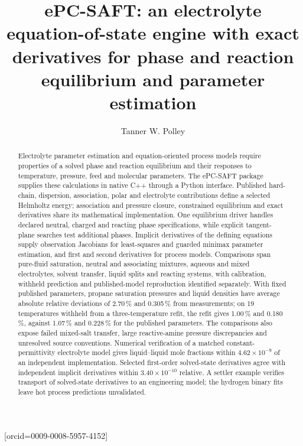 \documentclass[a4paper,fleqn]{cas-sc}
\begin{document}

\title[mode = title]{\texorpdfstring{ePC-SAFT: an electrolyte equation-of-state engine with exact derivatives for phase and reaction equilibrium and parameter estimation}{ePC-SAFT: an electrolyte equation-of-state engine with exact derivatives for phase and reaction equilibrium and parameter estimation}}

\author[1]{Tanner W. Polley}[orcid=0009-0008-5957-4152]
\cormark[1]



\begin{abstract}
Electrolyte parameter estimation and equation-oriented process models require properties of a solved phase and reaction equilibrium and their responses to temperature, pressure, feed and molecular parameters.
The ePC-SAFT package supplies these calculations in native C++ through a Python interface.
Published hard-chain, dispersion, association, polar and electrolyte contributions define a selected Helmholtz energy; association and pressure closure, constrained equilibrium and exact derivatives share its mathematical implementation.
One equilibrium driver handles declared neutral, charged and reacting phase specifications, while explicit tangent-plane searches test additional phases.
Implicit derivatives of the defining equations supply observation Jacobians for least-squares and guarded minimax parameter estimation, and first and second derivatives for process models.
Comparisons span pure-fluid saturation, neutral and associating mixtures, aqueous and mixed electrolytes, solvent transfer, liquid splits and reacting systems, with calibration, withheld prediction and published-model reproduction identified separately.
With fixed published parameters, propane saturation pressures and liquid densities have average absolute relative deviations of 2.70\,\% and 0.305\,\% from measurements; on 19 temperatures withheld from a three-temperature refit, the refit gives 1.00\,\% and 0.180\,\%, against 1.07\,\% and 0.228\,\% for the published parameters.
The comparisons also expose failed mixed-salt transfer, large reactive-amine pressure discrepancies and unresolved source conventions.
Numerical verification of a matched constant-permittivity electrolyte model gives liquid--liquid mole fractions within $4.62\times10^{-9}$ of an independent implementation.
Selected first-order solved-state derivatives agree with independent implicit derivatives within $3.40\times10^{-10}$ relative.
A settler example verifies transport of solved-state derivatives to an engineering model; the hydrogen binary fits leave hot process predictions unvalidated.
\end{abstract}
\end{document}
